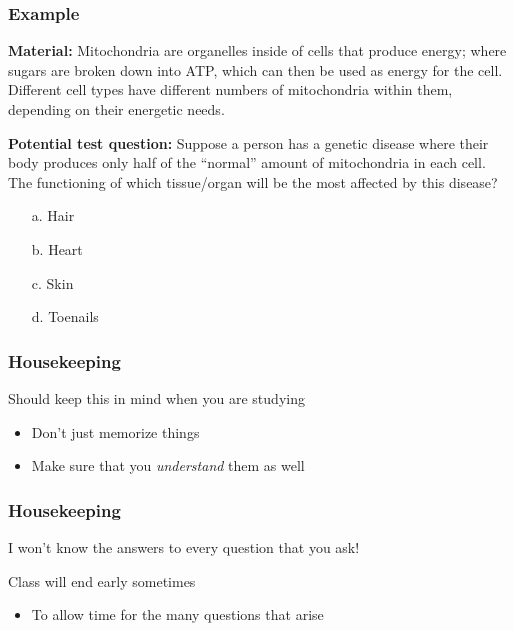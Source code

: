 \documentclass[10pt]{beamer}
\begin{document}
\begin{frame}[t]
\frametitle{Example}
\vspace{0.5cm}

	\textbf{Material:} Mitochondria are organelles inside of cells that produce energy; where sugars are broken down into ATP, which can then be used as energy for the cell. Different cell types have different numbers of mitochondria within them, depending on their energetic needs.
	
	\bigskip
	
	\textbf{Potential test question:}
	Suppose a person has a genetic disease where their body produces only half of the ``normal'' amount of mitochondria in each cell. The functioning of which tissue/organ will be the most affected by this disease? 
	
		\begin{enumerate}
			\item[a.] Hair
			\item[b.] Heart
			\item[c.] Skin
			\item[d.] Toenails 
		\end{enumerate}	
\end{frame}


\begin{frame}[t]
\frametitle{Housekeeping}
\vspace{0.5cm}

	Should keep this in mind when you are studying
	
		\begin{itemize}
			\medskip
			\item Don't just memorize things
			\bigskip
			\item Make sure that you \emph{understand} them as well
		\end{itemize}
\end{frame}


\begin{frame}[t]
\frametitle{Housekeeping}
\vspace{0.5cm}

	I won't know the answers to every question that you ask!
		
	\bigskip
		
	Class will end early sometimes
		\begin{itemize}
			\item To allow time for the many questions that arise
		\end{itemize}
\end{frame}
\end{document}

